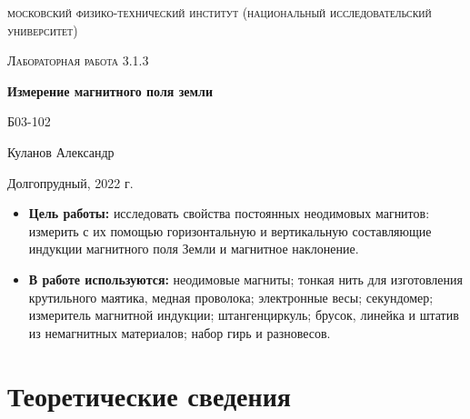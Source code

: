 \documentclass[a4paper, 12pt]{article}
\begin{document}
\begin{titlepage}
	\centering
	\vspace{5cm}
	{\scshape\LARGE московский физико-технический институт (национальный исследовательский университет) \par}
	\vspace{6cm}
	{\scshape\Large Лабораторная работа 3.1.3 \par}
	{\huge\bfseries Измерение магнитного поля земли \par}
	\vspace{1cm}
	\vfill
\begin{flushright}
	{\large Б03-102}\par
	\vspace{0.3cm}
	{\LARGE Куланов Александр}
\end{flushright}
	

	\vfill


	Долгопрудный, 2022 г.
\end{titlepage}

\begin{itemize}
	\item \textbf{Цель работы:} исследовать свойства постоянных неодимовых магнитов: измерить с их
	помощью горизонтальную и вертикальную составляющие индукции магнитного поля Земли и магнитное наклонение.
    \item \textbf{В работе используются:} неодимовые магниты; тонкая нить для изготовления крутильного маятика,
    медная проволока; электронные весы; секундомер; измеритель магнитной индукции; штангенциркуль; брусок,
	линейка и штатив из немагнитных материалов; набор гирь и разновесов.
    
\end{itemize}

\section{Теоретические сведения}
\end{document}
